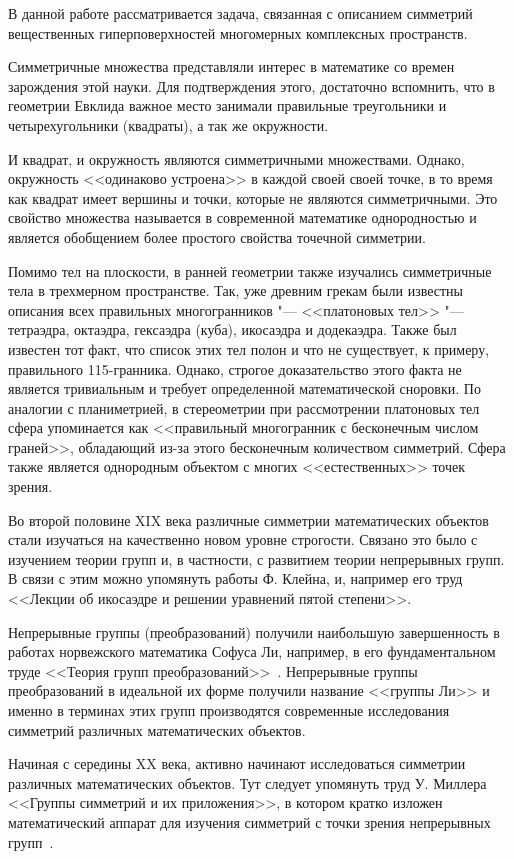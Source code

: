 \documentclass[../main.tex]{subfiles}
\begin{document}
В данной работе рассматривается задача, связанная с описанием симметрий вещественных гиперповерхностей многомерных комплексных пространств.

Симметричные множества представляли интерес в математике со времен зарождения этой науки. Для подтверждения этого, достаточно вспомнить, что в геометрии Евклида важное место занимали правильные треугольники и четырехугольники (квадраты), а так же окружности.

И квадрат, и окружность являются симметричными множествами. Однако, окружность <<одинаково устроена>> в каждой своей своей точке, в то время как квадрат имеет вершины и точки, которые не являются симметричными. Это свойство множества называется в современной математике однородностью и является обобщением более простого свойства точечной симметрии.

Помимо тел на плоскости, в ранней геометрии также изучались симметричные тела в трехмерном пространстве. Так, уже древним грекам были известны описания всех правильных многогранников "--- <<платоновых тел>> "--- тетраэдра, октаэдра, гексаэдра (куба), икосаэдра и додекаэдра. Также был известен тот факт, что список этих тел полон и что не существует, к примеру, правильного 115-гранника. Однако, строгое доказательство этого факта не является тривиальным и требует определенной математической сноровки. По аналогии с планиметрией, в стереометрии при рассмотрении платоновых тел сфера упоминается как <<правильный многогранник с бесконечным числом граней>>, обладающий из-за этого бесконечным количеством симметрий. Сфера также является однородным объектом с многих <<естественных>> точек зрения.

Во второй половине XIX века различные симметрии математических объектов стали изучаться на качественно новом уровне строгости. Связано это было с изучением теории групп и, в частности, с развитием теории непрерывных групп. В связи с этим можно упомянуть работы Ф. Клейна, и, например его труд <<Лекции об икосаэдре и решении уравнений пятой степени>>.

Непрерывные группы (преобразований) получили наибольшую завершенность в работах норвежского математика Софуса Ли, например, в его фундаментальном труде <<Теория групп преобразований>>~\cite{lie}. Непрерывные группы преобразований в идеальной их форме получили название <<группы Ли>> и именно в терминах этих групп производятся современные исследования симметрий различных математических объектов.

Начиная с середины XX века, активно начинают исследоваться симметрии различных математических объектов. Тут следует упомянуть труд У. Миллера <<Группы симметрий и их приложения>>, в котором кратко изложен математический аппарат для изучения симметрий с точки зрения непрерывных групп~\cite{miller1973symmetry}.
\end{document}
